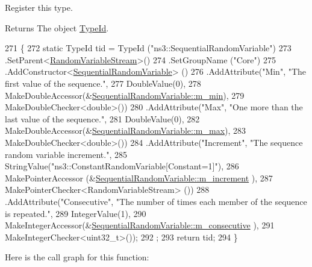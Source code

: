 Register this type. 

\begin{DoxyReturn}{Returns}
The object \hyperlink{classns3_1_1TypeId}{Type\+Id}. 
\end{DoxyReturn}

\begin{DoxyCode}
271 \{
272   \textcolor{keyword}{static} TypeId tid = TypeId (\textcolor{stringliteral}{"ns3::SequentialRandomVariable"})
273     .SetParent<\hyperlink{classns3_1_1RandomVariableStream_ab6dd72fd15a0043b678ff56ac326b233}{RandomVariableStream}>()
274     .SetGroupName (\textcolor{stringliteral}{"Core"})
275     .AddConstructor<\hyperlink{classns3_1_1SequentialRandomVariable_aed65a4dd9c1d8ecbded1b11a852ab59a}{SequentialRandomVariable}> ()
276     .AddAttribute(\textcolor{stringliteral}{"Min"}, \textcolor{stringliteral}{"The first value of the sequence."},
277                   DoubleValue(0),
278                   MakeDoubleAccessor(&\hyperlink{classns3_1_1SequentialRandomVariable_a168c620d4730301c20caab6abcbd00dc}{SequentialRandomVariable::m\_min}),
279                   MakeDoubleChecker<double>())
280     .AddAttribute(\textcolor{stringliteral}{"Max"}, \textcolor{stringliteral}{"One more than the last value of the sequence."},
281                   DoubleValue(0),
282                   MakeDoubleAccessor(&\hyperlink{classns3_1_1SequentialRandomVariable_ab3ab59c289b5ee0751562c5e46020def}{SequentialRandomVariable::m\_max}),
283                   MakeDoubleChecker<double>())
284     .AddAttribute(\textcolor{stringliteral}{"Increment"}, \textcolor{stringliteral}{"The sequence random variable increment."},
285                   StringValue(\textcolor{stringliteral}{"ns3::ConstantRandomVariable[Constant=1]"}),
286                   MakePointerAccessor (&\hyperlink{classns3_1_1SequentialRandomVariable_abb30c71cae8727ea8c2330f0dc309e6f}{SequentialRandomVariable::m\_increment}
      ),
287                   MakePointerChecker<RandomVariableStream> ())
288     .AddAttribute(\textcolor{stringliteral}{"Consecutive"}, \textcolor{stringliteral}{"The number of times each member of the sequence is repeated."},
289                   IntegerValue(1),
290                   MakeIntegerAccessor(&\hyperlink{classns3_1_1SequentialRandomVariable_a4c6baa5a3e757ccee2928b8d4ba9fcf3}{SequentialRandomVariable::m\_consecutive}
      ),
291                   MakeIntegerChecker<uint32\_t>());
292      ;
293   \textcolor{keywordflow}{return} tid;
294 \}
\end{DoxyCode}


Here is the call graph for this function\+:


